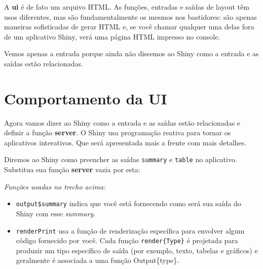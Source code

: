 \documentclass[
]{book}
\newenvironment{Shaded}{\begin{snugshade}}{\end{snugshade}}
\newcommand{\ControlFlowTok}[1]{\textcolor[rgb]{0.13,0.29,0.53}{\textbf{#1}}}
\newcommand{\FunctionTok}[1]{\textcolor[rgb]{0.00,0.00,0.00}{#1}}
\newcommand{\NormalTok}[1]{#1}
\newcommand{\OtherTok}[1]{\textcolor[rgb]{0.56,0.35,0.01}{#1}}
\newcommand{\SpecialCharTok}[1]{\textcolor[rgb]{0.00,0.00,0.00}{#1}}
\newcommand{\StringTok}[1]{\textcolor[rgb]{0.31,0.60,0.02}{#1}}
\begin{document}
A \textbf{ui} é de fato um arquivo HTML. As funções, entradas e saídas de layout têm usos diferentes, mas são fundamentalmente os mesmos nos bastidores: são apenas maneiras sofisticadas de gerar HTML e, se você chamar qualquer uma delas fora de um aplicativo Shiny, verá uma página HTML impresso no console.

Vemos apenas a entrada porque ainda não dissemos ao Shiny como a entrada e as saídas estão relacionadas.

\hypertarget{comportamento-da-ui}{%
\section{\texorpdfstring{\textbf{Comportamento da UI}}{Comportamento da UI}}\label{comportamento-da-ui}}

Agora vamos dizer ao Shiny como a entrada e as saídas estão relacionadas e definir a função \textbf{server}.
O Shiny usa programação reativa para tornar os aplicativos interativos. Que será apresentada mais a frente com mais detalhes.

Diremos ao Shiny como preencher as saídas \texttt{summary} e \texttt{table} no aplicativo. Substitua sua função \textbf{server} vazia por esta:

\begin{Shaded}
\end{Shaded}

\emph{Funções usadas no trecho acima:}

\begin{itemize}
\item
  \texttt{output\$summary} indica que você está fornecendo como será sua saída do Shiny com esse \emph{summary}.
\item
  \texttt{renderPrint} usa a função de renderização específica para envolver algum código fornecido por você. Cada função \texttt{render\{Type\}} é projetada para produzir um tipo específico de saída (por exemplo, texto, tabelas e gráficos) e geralmente é associada a uma função Output\{type\}.
\end{itemize}
\end{document}
